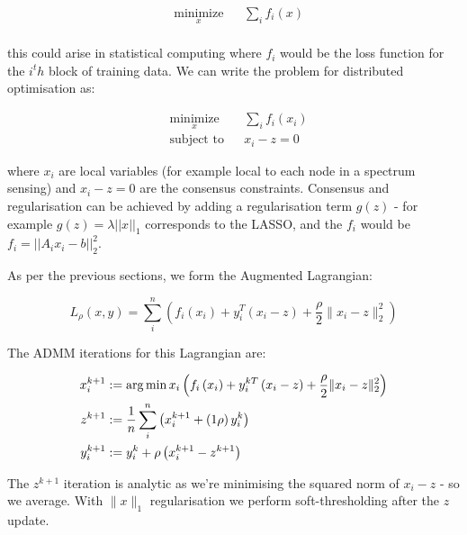 \documentclass[titlepage]{article}
\begin{document}
\begin{equation*}
\begin{aligned}
& \underset{x}{\text{minimize}}
& & \sum_i f_i\left( x \right) \\
\label{consensus}
\end{aligned}
\end{equation*}

this could arise in statistical computing where \(f_i\) would be the loss function for the \(i^th\) block of training data. We can write the problem for distributed optimisation as:

\begin{equation*}
\begin{aligned}
& \underset{x}{\text{minimize}}
& & \sum_i f_i\left( x_i \right) \\
& \text{subject to}
& & x_i - z = 0
\label{admm_consensus}
\end{aligned}
\end{equation*}

where \(x_i\) are local variables (for example local to each node in a spectrum sensing) and \(x_i - z = 0\) are the consensus constraints. Consensus and regularisation can be achieved by adding a regularisation term \(g\left(z\right)\) - for example \(g\left(z\right) = \lambda||x||_1\) corresponds to the LASSO, and the \(f_i\) would be \(f_i = ||A_ix_i - b||_2^2\). 

As per the previous sections, we form the Augmented Lagrangian:

\begin{equation}
L_\rho\left(x,y\right) = \sum_i^n \left(f_i\left( x_i \right) + y_i^T\left(x_i-z\right) + \frac{\rho}{2}\|x_i-z\|_2^2\right)
\end{equation}

The ADMM iterations for this Lagrangian are:

\begin{align}
x_i^{k+1} &:= \operatorname*{arg\,min}{x_i} \left(f_i\left( x_i \right) + y_i^{kT}\left(x_i-z\right) + \frac{\rho}{2}\|x_i-z\|_2^2\right)\\
z^{k+1} &:= \frac{1}{n}\sum_i^n \left(x_i^{k+1} + \left(1\rho\right)y_i^k\right)\\
y_i^{k+1} &:= y_i^{k} + \rho \left(x_i^{k+1} - z^{k+1} \right)
\label{consensus_iterations}
\end{align}

The \(z^{k+1}\) iteration is analytic as we're minimising the squared norm of \(x_i - z\) - so we average. With \(\|x\|_1\) regularisation we perform soft-thresholding after the \(z\) update.
\end{document}
